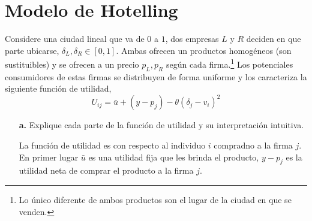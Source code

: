 \documentclass{exam}
\begin{document}
\section{Modelo de Hotelling}
Considere una ciudad lineal que va de $0$ a $1$, dos empresas $L$ y $R$ deciden en que parte ubicarse, $\delta _L,\delta_R \in [0,1]$. Ambas ofrecen un productos homogéneos (son sustituibles) y se ofrecen a un precio $p_L, p_R$ según cada firma.\footnote{Lo único diferente de ambos productos son el lugar de la ciudad en que se venden.} Los potenciales consumidores de estas firmas se distribuyen de forma uniforme y los caracteriza la siguiente función de utilidad,
\begin{equation*}
    U_{ij} = \bar{u} + (y-p_j) - \theta (\delta_j - v_i)^2 \label{función utilidad}
\end{equation*}
\begin{enumerate}
    \item[\textbf{a.}] Explique cada parte de la función de utilidad y su interpretación intuitiva.
    \begin{solution}
        La función de utilidad es con respecto al individuo $i$ compradno a la firma $j$. En primer lugar $\bar{u}$ es una utilidad fija que les brinda el producto, $y-p_j$ es la utilidad neta de comprar el producto a la firma $j$. 


\end{solution}
\end{enumerate}
\end{document}
